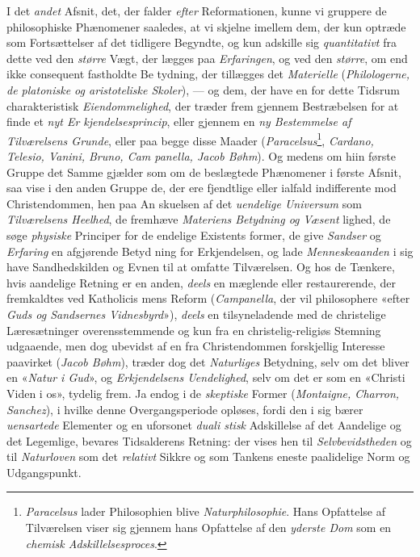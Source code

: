 I det \emph{andet} Afsnit, det, der falder \emph{efter} Reformationen,
kunne vi gruppere de philosophiske Phænomener saaledes, at
vi skjelne imellem dem, der kun optræde som Fortsættelser
af det tidligere Begyndte, og kun adskille sig \emph{quantitativt}
fra dette ved den \emph{større} Vægt, der lægges paa \emph{Erfaringen},
og ved den \emph{større}, om end ikke consequent fastholdte Be\-%
tydning, der tillægges det \emph{Materielle} (\emph{Philologerne, de
platoniske og aristoteliske Skoler}), --- og dem, der have en
for dette Tidsrum charakteristisk \emph{Eiendommelighed}, der
træder frem gjennem Bestræbelsen for at finde et \emph{nyt Er\-%
kjendelsesprincip}, eller gjennem en \emph{ny Bestemmelse
af Tilværelsens Grunde}, eller paa begge disse Maader
(\emph{Paracelsus}\footnote{\emph{Paracelsus} lader Philosophien blive \emph{Naturphilosophie}. Hans
Opfattelse af Tilværelsen viser sig gjennem hans Opfattelse af den
\emph{yderste Dom} som en \emph{chemisk Adskillelsesproces}.}, \emph{Cardano, Telesio, Vanini, Bruno, Cam\-%
panella, Jacob Bøhm}). Og medens om hiin første Gruppe
det Samme gjælder som om de beslægtede Phænomener i første
Afsnit, saa vise i den anden Gruppe de, der ere fjendtlige
eller ialfald indifferente mod Christendommen, hen paa An\-%
skuelsen af det \emph{uendelige Universum} som \emph{Tilværelsens
Heelhed}, de fremhæve \emph{Materiens Betydning og Væsent\-}%
lighed, de søge \emph{physiske} Principer for de endelige Existents\-%
former, de give \emph{Sandser} og \emph{Erfaring} en afgjørende Betyd\-%
ning for Erkjendelsen, og lade \emph{Menneskeaanden} i sig have
Sandhedskilden og Evnen til at omfatte Tilværelsen. Og hos
de Tænkere, hvis aandelige Retning er en anden, \emph{deels} en
mæglende eller restaurerende, der fremkaldtes ved Katholicis\-%
mens Reform (\emph{Campanella}, der vil philosophere «efter \emph{Guds
og Sandsernes Vidnesbyrd}»), \emph{deels} en tilsyneladende med
de christelige Læresætninger overensstemmende og kun fra en
christelig-religiøs Stemning udgaaende, men dog ubevidst af
en fra Christendommen forskjellig Interesse paavirket (\emph{Jacob
Bøhm}), træder dog det \emph{Naturliges} Betydning, selv om det
bliver en «\emph{Natur i Gud}», og \emph{Erkjendelsens Uendelighed},
selv om det er som en «Christi Viden i os», tydelig frem.
Ja endog i de \emph{skeptiske} Former (\emph{Montaigne, Charron,
Sanchez}), i hvilke denne Overgangsperiode opløses, fordi den
i sig bærer \emph{uensartede} Elementer og en uforsonet \emph{duali\-%
stisk} Adskillelse af det Aandelige og det Legemlige, bevares
Tidsalderens Retning: der vises hen til \emph{Selvbevidstheden}
og til \emph{Naturloven} som det \emph{relativt} Sikkre og som Tankens
eneste paalidelige Norm og Udgangspunkt.

